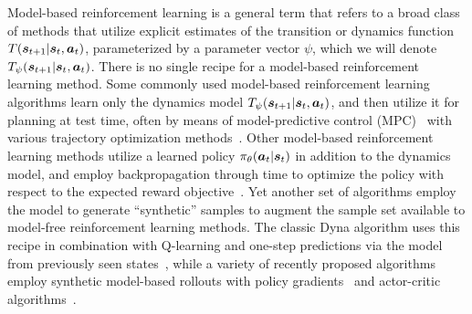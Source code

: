 \documentclass[../thesis.tex]{subfiles}
\begin{document}
Model-based reinforcement learning is a general term that refers to a broad class of methods that utilize explicit estimates of the transition or dynamics function $T(\boldsymbol{s}_{t+1}|\boldsymbol{s}_t,\boldsymbol{a}_t)$, parameterized by a parameter vector $\psi$, which we will denote $T_\psi(\boldsymbol{s}_{t+1}|\boldsymbol{s}_t,\boldsymbol{a}_t)$. There is no single recipe for a model-based reinforcement learning method. Some commonly used model-based reinforcement learning algorithms learn only the dynamics model $T_\psi(\boldsymbol{s}_{t+1}|\boldsymbol{s}_t,\boldsymbol{a}_t)$, and then utilize it for planning at test time, often by means of model-predictive control (MPC)~\citep{tassa2012synthesis} with various trajectory optimization methods~\citep{nagabandi2018neural,pets}. Other model-based reinforcement learning methods utilize a learned policy $\pi_\theta(\boldsymbol{a}_t|\boldsymbol{s}_t)$ in addition to the dynamics model, and employ backpropagation through time to optimize the policy with respect to the expected reward objective~\citep{deisenroth2011pilco}. Yet another set of algorithms employ the model to generate ``synthetic'' samples to augment the sample set available to model-free reinforcement learning methods. The classic Dyna algorithm uses this recipe in combination with Q-learning and one-step predictions via the model from previously seen states~\citep{sutton1991dyna}, while a variety of recently proposed algorithms employ synthetic model-based rollouts with policy gradients~\citep{pipps,simpl} and actor-critic algorithms~\citep{mbpo}. 

\end{document}
